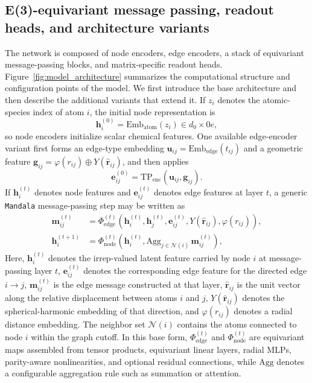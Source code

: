 \documentclass[preprint,12pt,compress,numafflabel]{elsarticle}
\begin{document}
\subsection{E(3)-equivariant message passing, readout heads, and architecture variants}
\label{subsec:architecture}

The network is composed of node encoders, edge encoders, a stack of equivariant message-passing blocks, and matrix-specific readout heads.
Figure~\ref{fig:model_architecture} summarizes the computational structure and configuration points of the model.
We first introduce the base architecture and then describe the additional variants that extend it.
If $z_i$ denotes the atomic-species index of atom $i$, the initial node representation is
\begin{equation}
\bm{h}_i^{(0)}
=
\mathrm{Emb}_{\mathrm{atom}}(z_i)
\in d_0 \times 0e,
\end{equation}
so node encoders initialize scalar chemical features. One available edge-encoder variant first forms an edge-type embedding $\bm{u}_{ij}=\mathrm{Emb}_{\mathrm{edge}}(t_{ij})$ and a geometric feature $\bm{g}_{ij}=\varphi(r_{ij}) \oplus Y(\hat{\bm{r}}_{ij})$, and then applies
\begin{equation}
\bm{e}_{ij}^{(0)}
=
\mathrm{TP}_{\mathrm{enc}}\!\left(\bm{u}_{ij},\bm{g}_{ij}\right).
\end{equation}
If $\bm{h}_i^{(t)}$ denotes node features and $\bm{e}_{ij}^{(t)}$ denotes edge features at layer $t$, a generic \texttt{Mandala}
message-passing step may be written as
\begin{align}
\bm{m}_{ij}^{(t)} &=
\Phi_{\mathrm{edge}}^{(t)}
\left(
\bm{h}_i^{(t)}, \bm{h}_j^{(t)}, \bm{e}_{ij}^{(t)},
Y(\hat{\bm{r}}_{ij}), \varphi(r_{ij})
\right), \\
\bm{h}_i^{(t+1)} &=
\Phi_{\mathrm{node}}^{(t)}
\left(
\bm{h}_i^{(t)},
\mathrm{Agg}_{j \in \mathcal{N}(i)} \, \bm{m}_{ij}^{(t)}
\right),
\end{align}
Here, $\bm{h}_i^{(t)}$ denotes the irrep-valued latent feature carried by node $i$ at message-passing layer $t$, $\bm{e}_{ij}^{(t)}$ denotes the corresponding edge feature for the directed edge $i \rightarrow j$, $\bm{m}_{ij}^{(t)}$ is the edge message constructed at that layer, $\hat{\bm{r}}_{ij}$ is the unit vector along the relative displacement between atoms $i$ and $j$, $Y(\hat{\bm{r}}_{ij})$ denotes the spherical-harmonic embedding of that direction, and $\varphi(r_{ij})$ denotes a radial distance embedding.
The neighbor set $\mathcal{N}(i)$ contains the atoms connected to node $i$ within the graph cutoff.
In this base form, $\Phi_{\mathrm{edge}}^{(t)}$ and $\Phi_{\mathrm{node}}^{(t)}$ are equivariant maps assembled from tensor products, equivariant linear layers, radial MLPs, parity-aware nonlinearities, and optional residual connections, while $\mathrm{Agg}$ denotes a configurable aggregation rule such as summation or attention.
\end{document}
